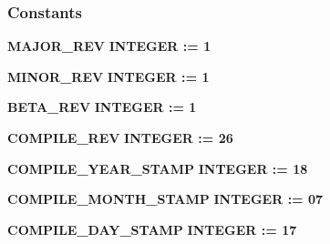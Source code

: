 \subsubsection*{Constants}
 \begin{DoxyCompactItemize}
\item 
{\bf M\+A\+J\+O\+R\+\_\+\+R\+EV} {\bfseries \textcolor{comment}{I\+N\+T\+E\+G\+ER}\textcolor{vhdlchar}{ }\textcolor{vhdlchar}{ }\textcolor{vhdlchar}{\+:}\textcolor{vhdlchar}{=}\textcolor{vhdlchar}{ }\textcolor{vhdlchar}{ } \textcolor{vhdldigit}{1} \textcolor{vhdlchar}{ }} 
\item 
{\bf M\+I\+N\+O\+R\+\_\+\+R\+EV} {\bfseries \textcolor{comment}{I\+N\+T\+E\+G\+ER}\textcolor{vhdlchar}{ }\textcolor{vhdlchar}{ }\textcolor{vhdlchar}{\+:}\textcolor{vhdlchar}{=}\textcolor{vhdlchar}{ }\textcolor{vhdlchar}{ } \textcolor{vhdldigit}{1} \textcolor{vhdlchar}{ }} 
\item 
{\bf B\+E\+T\+A\+\_\+\+R\+EV} {\bfseries \textcolor{comment}{I\+N\+T\+E\+G\+ER}\textcolor{vhdlchar}{ }\textcolor{vhdlchar}{ }\textcolor{vhdlchar}{\+:}\textcolor{vhdlchar}{=}\textcolor{vhdlchar}{ }\textcolor{vhdlchar}{ } \textcolor{vhdldigit}{1} \textcolor{vhdlchar}{ }} 
\item 
{\bf C\+O\+M\+P\+I\+L\+E\+\_\+\+R\+EV} {\bfseries \textcolor{comment}{I\+N\+T\+E\+G\+ER}\textcolor{vhdlchar}{ }\textcolor{vhdlchar}{ }\textcolor{vhdlchar}{\+:}\textcolor{vhdlchar}{=}\textcolor{vhdlchar}{ }\textcolor{vhdlchar}{ } \textcolor{vhdldigit}{26} \textcolor{vhdlchar}{ }} 
\item 
{\bf C\+O\+M\+P\+I\+L\+E\+\_\+\+Y\+E\+A\+R\+\_\+\+S\+T\+A\+MP} {\bfseries \textcolor{comment}{I\+N\+T\+E\+G\+ER}\textcolor{vhdlchar}{ }\textcolor{vhdlchar}{ }\textcolor{vhdlchar}{\+:}\textcolor{vhdlchar}{=}\textcolor{vhdlchar}{ }\textcolor{vhdlchar}{ } \textcolor{vhdldigit}{18} \textcolor{vhdlchar}{ }} 
\item 
{\bf C\+O\+M\+P\+I\+L\+E\+\_\+\+M\+O\+N\+T\+H\+\_\+\+S\+T\+A\+MP} {\bfseries \textcolor{comment}{I\+N\+T\+E\+G\+ER}\textcolor{vhdlchar}{ }\textcolor{vhdlchar}{ }\textcolor{vhdlchar}{\+:}\textcolor{vhdlchar}{=}\textcolor{vhdlchar}{ }\textcolor{vhdlchar}{ } \textcolor{vhdldigit}{07} \textcolor{vhdlchar}{ }} 
\item 
{\bf C\+O\+M\+P\+I\+L\+E\+\_\+\+D\+A\+Y\+\_\+\+S\+T\+A\+MP} {\bfseries \textcolor{comment}{I\+N\+T\+E\+G\+ER}\textcolor{vhdlchar}{ }\textcolor{vhdlchar}{ }\textcolor{vhdlchar}{\+:}\textcolor{vhdlchar}{=}\textcolor{vhdlchar}{ }\textcolor{vhdlchar}{ } \textcolor{vhdldigit}{17} \textcolor{vhdlchar}{ }} 
\item 

\end{DoxyCompactItemize}
